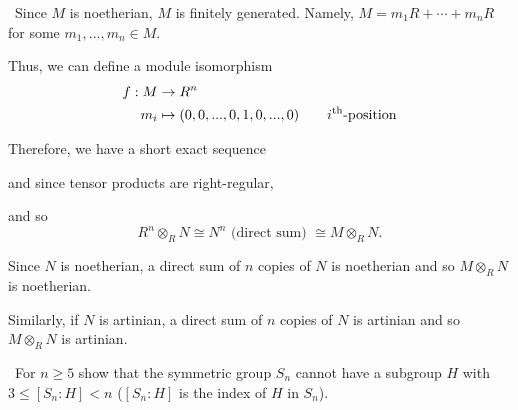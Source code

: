 \documentclass[12pt]{Qual}
\begin{document}
\begin{solution}$\,$
Since $M$ is noetherian, $M$ is finitely generated. Namely, $M=m_1R+\cdots+m_nR$ for some $m_1,...,m_n\in M$.

Thus, we can define a module isomorphism \begin{align*}
    f:M&\to R^n\\
    m_i&\mapsto (0,0,...,0,1,0,...,0)\qquad i^\text{th}\text{-position}
\end{align*}

Therefore, we have a short exact sequence
\begin{center}
\end{center} and since tensor products are right-regular,

\begin{center}
\end{center}

and so $$R^n\otimes_RN\cong N^n\text{ (direct sum) }\cong M\otimes_RN.$$

Since $N$ is noetherian, a direct sum of $n$ copies of $N$ is noetherian and so $M\otimes_RN$ is noetherian.

Similarly, if $N$ is artinian, a direct sum of $n$ copies of $N$ is artinian and so $M\otimes_R N$ is artinian.

\end{solution}
\newpage



\begin{problem} $\,$
For $n\ge 5$ show that the symmetric group $S_n$ cannot have a subgroup $H$ with $3\le [S_n:H]<n$ ($[S_n:H]$ is the index of $H$ in $S_n$).
\end{problem}
\end{document}
